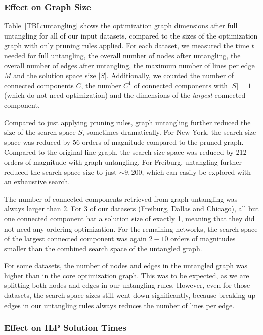 \documentclass[format=acmsmall, review=false, screen=true]{acmart}
\begin{document}
\subsubsection{Effect on Graph Size} 

Table~\ref{TBL:untangling} shows the optimization graph dimensions after full untangling for all of our input datasets, compared to the sizes of the optimization graph with only pruning rules applied.
For each dataset, we measured the time $t$ needed for full untangling, the overall number of nodes after untangling, the overall number of edges after untangling, the maximum number of lines per edge $M$ and the solution space size $|S|$. Additionally, we counted the number of connected components $C$, the number $C^1$ of connected components with $|S| = 1$ (which do not need optimization) and the dimensions of the \emph{largest} connected component.

Compared to just applying pruning rules, graph untangling further reduced the size of the search space $S$, sometimes dramatically.
For New York, the search size space was reduced by 56 orders of magnitude compared to the pruned graph.
Compared to the original line graph, the search size space was reduced by 212 orders of magnitude with graph untangling.
For Freiburg, untangling further reduced the search space size to just $\sim 9,200$, which can easily be explored with an exhaustive search.

The number of connected components retrieved from graph untangling was always larger than 2.
For 3 of our datasets (Freiburg, Dallas and Chicago), all but one connected component hat a solution size of exactly 1, meaning that they did not need any ordering optimization.
For the remaining networks, the search space of the largest connected component was again $2 - 10$ orders of magnitudes smaller than the combined search space of the untangled graph.

For some datasets, the number of nodes and edges in the untangled graph was higher than in the core optimization graph.
This was to be expected, as we are splitting both nodes and edges in our untangling rules.
However, even for those datasets, the search space sizes still went down significantly, because breaking up edges in our untangling rules always reduces the number of lines per edge.

\subsubsection{Effect on ILP Solution Times}
\end{document}
